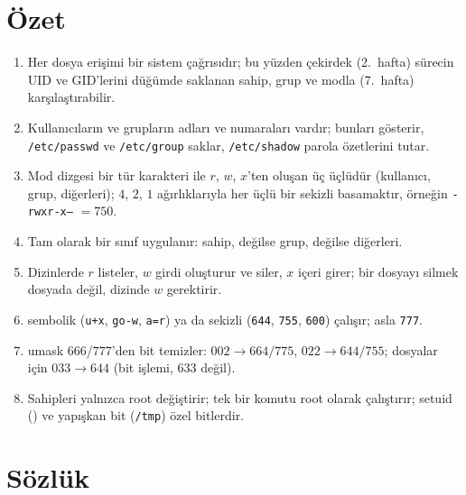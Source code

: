 \section{Özet}

\begin{keyidea}
\begin{enumerate}[leftmargin=1.4em]
  \item Her dosya erişimi bir sistem çağrısıdır; bu yüzden çekirdek (2.~hafta) sürecin UID ve GID'lerini düğümde saklanan sahip, grup ve modla (7.~hafta) karşılaştırabilir.
  \item Kullanıcıların ve grupların adları ve numaraları vardır;  bunları gösterir, \texttt{/etc/passwd} ve \texttt{/etc/group} saklar, \texttt{/etc/shadow} parola özetlerini tutar.
  \item Mod dizgesi bir tür karakteri ile $r$, $w$, $x$'ten oluşan üç üçlüdür (kullanıcı, grup, diğerleri); $4$, $2$, $1$ ağırlıklarıyla her üçlü bir sekizli basamaktır, örneğin \texttt{-rwxr-x---} $= 750$.
  \item Tam olarak bir sınıf uygulanır: sahip, değilse grup, değilse diğerleri.
  \item Dizinlerde $r$ listeler, $w$ girdi oluşturur ve siler, $x$ içeri girer; bir dosyayı silmek dosyada değil, dizinde $w$ gerektirir.
  \item {} sembolik (\texttt{u+x}, \texttt{go-w}, \texttt{a=r}) ya da sekizli (\texttt{644}, \texttt{755}, \texttt{600}) çalışır; asla \texttt{777}.
  \item umask $666$/$777$'den bit temizler: $002 \to 664/775$, $022 \to 644/755$; dosyalar için $033 \to 644$ (bit işlemi, $633$ değil).
  \item Sahipleri yalnızca root değiştirir;  tek bir komutu root olarak çalıştırır; setuid () ve yapışkan bit (\texttt{/tmp}) özel bitlerdir.
\end{enumerate}
\end{keyidea}

\section{Sözlük}

